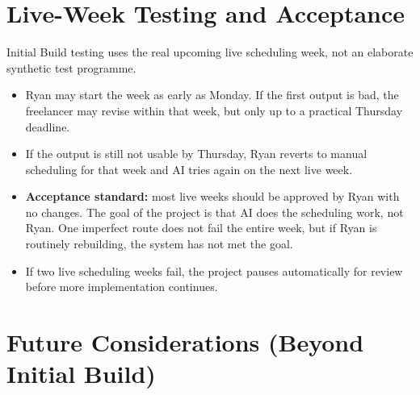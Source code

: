 \documentclass[12pt]{article}
\begin{document}
\section*{Live-Week Testing and Acceptance}
\label{sec:testing_live}

Initial Build testing uses the real upcoming live scheduling week, not an elaborate synthetic test programme.

\begin{itemize}
    \item Ryan may start the week as early as Monday.  If the first output is bad, the freelancer may revise within that week, but only up to a practical Thursday deadline.
    \item If the output is still not usable by Thursday, Ryan reverts to manual scheduling for that week and AI tries again on the next live week.
    \item \textbf{Acceptance standard:} most live weeks should be approved by Ryan with no changes.  The goal of the project is that AI does the scheduling work, not Ryan.  One imperfect route does not fail the entire week, but if Ryan is routinely rebuilding, the system has not met the goal.
    \item If two live scheduling weeks fail, the project pauses automatically for review before more implementation continues.
\end{itemize}

\section*{Future Considerations (Beyond Initial Build)}
\end{document}
